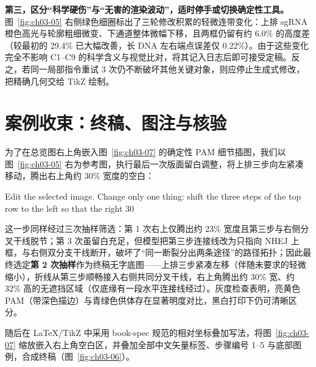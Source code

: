 \textbf{第三，区分“科学硬伤”与“无害的渲染波动”，适时停手或切换确定性工具。} 图~\ref{fig:ch03-05} 右侧绿色细圈标出了三轮修改积累的轻微连带变化：上排 sgRNA 橙色高光与轮廓粗细微变、下通道整体微幅下移，且两框仍留有约 6.0\% 的高度差（较最初的 29.4\% 已大幅改善，长 DNA 左右端点误差仅 0.22\%）。由于这些变化完全不影响 C1–C9 的科学含义与视觉比对，将其记入日志后即可接受定稿。反之，若同一局部指令重试 3 次仍不断破坏其他关键对象，则应停止生成式修改，把精确几何交给 TikZ 绘制。

\section{案例收束：终稿、图注与核验}

为了在总览图右上角嵌入图~\ref{fig:ch03-07} 的确定性 PAM 细节插图，我们以图~\ref{fig:ch03-05} 右为参考图，执行最后一次版面留白调整，将上排三步向左紧凑移动，腾出右上角约 30\% 宽度的空白：

\begin{Prompt}
Edit the selected image. Change only one thing: shift the three steps of the top row to the left so that the right 30%
\end{Prompt}

这一步同样经过三次抽样筛选：第 1 次右上仅腾出约 23\% 宽度且第三步与右侧分叉干线脱节；第 3 次虽留白充足，但模型把第三步连接线改为只指向 NHEJ 上框，与右侧双分支干线断开，破坏了“同一断裂分出两条途径”的路径拓扑；因此最终选定\textbf{第 2 次抽样}作为终稿无字底图——上排三步紧凑左移（伴随未要求的轻微缩小），折线从第三步顺畅接入右侧共同分叉干线，右上角腾出约 30\% 宽、约 32\% 高的无遮挡区域（仅底缘有一段水平连接线经过）。灰度检查表明，亮黄色 PAM（带深色描边）与青绿色供体存在显著明度对比，黑白打印下仍可清晰区分。

随后在 LaTeX/TikZ 中采用 book-spec 规范的相对坐标叠加写法，将图~\ref{fig:ch03-07} 缩放嵌入右上角空白区，并叠加全部中文矢量标签、步骤编号 1–5 与底部图例，合成终稿（图~\ref{fig:ch03-06}）。

